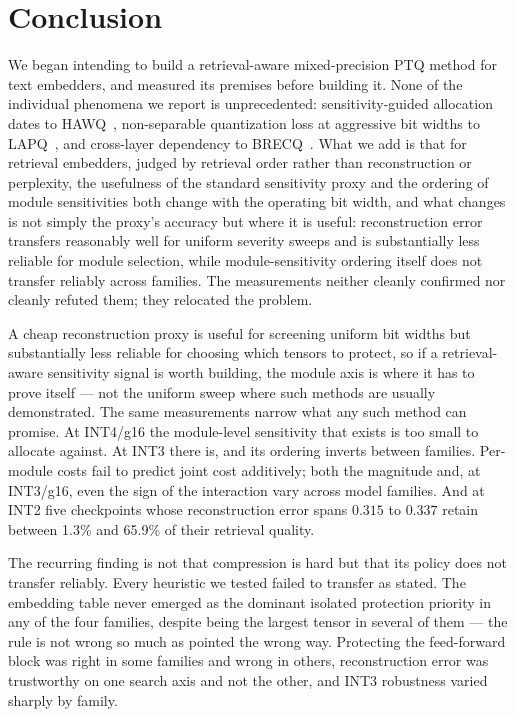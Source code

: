 \documentclass[11pt]{article}
\begin{document}
\section{Conclusion}

We began intending to build a retrieval-aware mixed-precision PTQ method for text embedders,
and measured its premises before building it. None of the individual phenomena we report is
unprecedented: sensitivity-guided allocation dates to HAWQ~\cite{hawq,hawqv2}, non-separable
quantization loss at aggressive bit widths to LAPQ~\cite{lapq}, and cross-layer dependency to
BRECQ~\cite{brecq}. What we add is that for retrieval embedders, judged by retrieval order
rather than reconstruction or perplexity, the usefulness of the standard sensitivity proxy
and the ordering of module sensitivities both change with the operating bit width, and
what changes is not simply the proxy's accuracy but where it is useful: reconstruction error
transfers reasonably well for uniform severity sweeps and is substantially less reliable for
module selection, while module-sensitivity ordering itself does not transfer reliably across
families. The measurements neither cleanly confirmed nor
cleanly refuted them; they relocated the problem.

A cheap reconstruction proxy is useful for screening uniform bit widths but substantially
less reliable for choosing which tensors to protect, so if a retrieval-aware sensitivity signal is worth
building, the module axis is where it has to prove itself --- not the uniform sweep where
such methods are usually demonstrated. The same measurements narrow what any such method can
promise. At INT4/g16 the module-level sensitivity that exists is too small to allocate against. At INT3
there is, and its ordering inverts between families. Per-module costs fail to predict joint cost
additively; both the magnitude and, at INT3/g16, even the sign of the interaction vary across
model families. And at INT2 five checkpoints whose reconstruction error
spans $0.315$ to $0.337$ retain between 1.3\% and 65.9\% of their retrieval quality.

The recurring finding is not that compression is hard but that its policy does not transfer
reliably.
Every heuristic we tested failed to transfer as stated. The embedding table never emerged as the
dominant isolated protection priority in any of the four families, despite being the largest
tensor in several of them --- the rule is not wrong so much as pointed the wrong way. Protecting the feed-forward
block was right in some families and wrong in others, reconstruction error was trustworthy on
one search axis and not the other, and INT3 robustness varied sharply by family.



\end{document}

